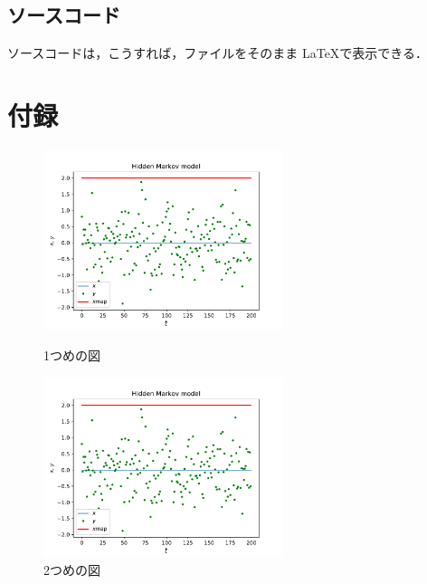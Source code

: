 \documentclass[a4paper,11pt,dvipdfmx]{jarticle}
\begin{document}
\subsection{ソースコード}
ソースコードは，こうすれば，ファイルをそのまま \LaTeX で表示できる．



\section*{付録}

\begin{figure}[htbp]
 \begin{minipage}{0.5\hsize}
  \begin{center}
   \includegraphics[width=70mm]{fig_hmm212.pdf}
  \end{center}
  \caption{1つめの図}
  \label{fig:one}
 \end{minipage}
 \begin{minipage}{0.5\hsize}
  \begin{center}
   \includegraphics[width=70mm]{fig_hmm212.pdf}
  \end{center}
  \caption{2つめの図}
  \label{fig:two}
 \end{minipage}
\end{figure}
\end{document}
